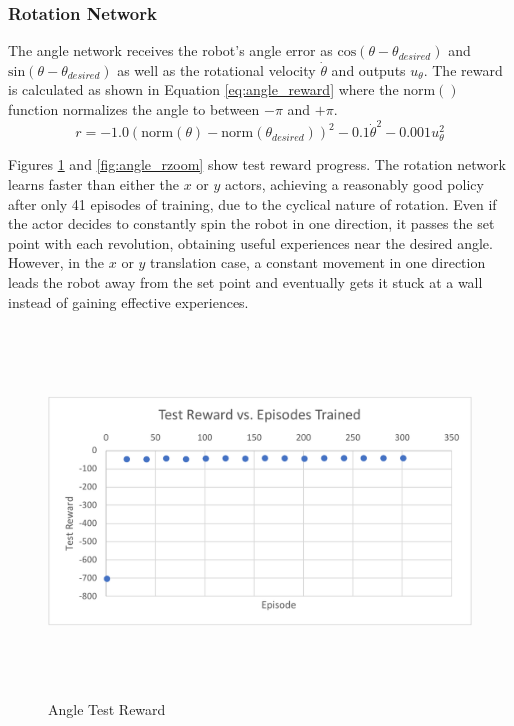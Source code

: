 \subsubsection{Rotation Network}
The angle network receives the robot's angle error as $\text{cos}(\theta-\theta_{desired})$ and $\text{sin}(\theta-\theta_{desired})$ as well as the rotational velocity $\dot{\theta}$ and outputs $u_\theta$. The reward is calculated as shown in Equation \ref{eq:angle_reward} where the $\text{norm}()$ function normalizes the angle to between $-\pi$ and $+\pi$.
\begin{equation}
r = -1.0(\text{norm}(\theta)-\text{norm}(\theta_{desired}))^2-0.1\dot{\theta}^2-0.001u_\theta^2
\label{eq:angle_reward}
\end{equation}

Figures \ref{fig:angle_r} and \ref{fig:angle_rzoom} show test reward progress. The rotation network learns faster than either the $x$ or $y$ actors, achieving a reasonably good policy after only 41 episodes of training, due to the cyclical nature of rotation. Even if the actor decides to constantly spin the robot in one direction, it passes the set point with each revolution, obtaining useful experiences near the desired angle. However, in the $x$ or $y$ translation case, a constant movement in one direction leads the robot away from the set point and eventually gets it stuck at a wall instead of gaining effective experiences.
\begin{figure}[H]
	\centering
	\includegraphics[width=6in, height=3.85in, keepaspectratio]{figures/train_figs/angle_r.pdf}
	\caption{Angle Test Reward} \label{fig:angle_r}
\end{figure}
